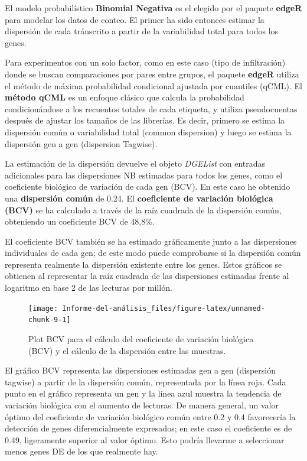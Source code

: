 \documentclass[]{article}
\begin{document}
El modelo probabilístico \textbf{Binomial Negativa} es el elegido por el
paquete \textbf{edgeR} para modelar los datos de conteo. El primer ha
sido entonces estimar la dispersión de cada tránscrito a partir de la
variabilidad total para todos los genes.

Para experimentos con un solo factor, como en este caso (tipo de
infiltración) donde se buscan comparaciones por pares entre grupos, el
paquete \textbf{edgeR} utiliza el método de máxima probabilidad
condicional ajustada por cuantiles (qCML). El \textbf{método qCML} es un
enfoque clásico que calcula la probabilidad condicionándose a los
recuentos totales de cada etiqueta, y utiliza pseudocuentas después de
ajustar los tamaños de las librerías. Es decir, primero se estima la
dispersión común o variabilidad total (common dispersion) y luego se
estima la dispersión gen a gen (dispersion Tagwise).

La estimación de la dispersión devuelve el objeto \emph{DGEList} con
entradas adicionales para las dispersiones NB estimadas para todos los
genes, como el coeficiente biológico de variación de cada gen (BCV). En
este caso he obtenido una \textbf{dispersión común} de 0.24. El
\textbf{coeficiente de variación biológica (BCV)} se ha calculado a
través de la raíz cuadrada de la dispersión común, obteniendo un
coeficiente BCV de 48,8\%.

El coeficiente BCV también se ha estimado gráficamente junto a las
dispersiones individuales de cada gen; de este modo puede comprobarse si
la dispersión común representa realmente la dispersión existente entre
los genes. Estos gráficos se obtienen al representar la raíz cuadrada de
las dispersiones estimadas frente al logaritmo en base 2 de las lecturas
por millón.

\begin{figure}[H]

{\centering \texttt{[image: Informe-del-análisis\_files/figure-latex/unnamed-chunk-9-1]} 

}

\caption{Plot BCV para el cálculo del coeficiente de variación biológica (BCV) y el cálculo de la dispersión entre las muestras.}\label{fig:unnamed-chunk-9}
\end{figure}

El gráfico BCV representa las dispersiones estimadas gen a gen
(dispersión tagwise) a partir de la dispersión común, representada por
la línea roja. Cada punto en el gráfico representa un gen y la línea
azul muestra la tendencia de variación biológica con el aumento de
lecturas. De manera general, un valor óptimo del coeficiente de
variación biológico común entre 0.2 y 0.4 favorecería la detección de
genes diferencialmente expresados; en este caso el coeficiente es de
0.49, ligeramente superior al valor óptimo. Esto podría llevarme a
seleccionar menos genes DE de los que realmente hay.
\end{document}
